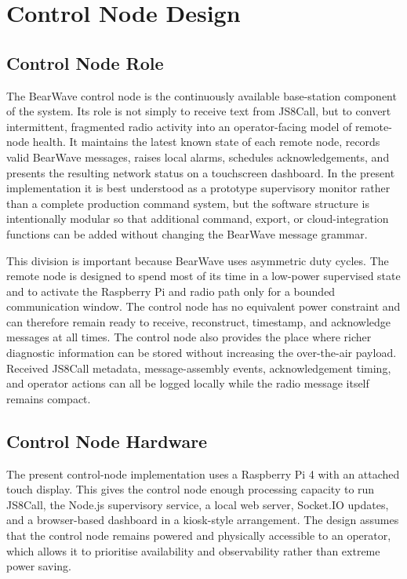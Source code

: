 \documentclass[acmsmall,screen]{acmart}
\begin{document}
\section{Control Node Design}

\subsection{Control Node Role}
The BearWave control node is the continuously available base-station component of the system. Its role is not simply to receive text from JS8Call, but to convert intermittent, fragmented radio activity into an operator-facing model of remote-node health. It maintains the latest known state of each remote node, records valid BearWave messages, raises local alarms, schedules acknowledgements, and presents the resulting network status on a touchscreen dashboard. In the present implementation it is best understood as a prototype supervisory monitor rather than a complete production command system, but the software structure is intentionally modular so that additional command, export, or cloud-integration functions can be added without changing the BearWave message grammar.

This division is important because BearWave uses asymmetric duty cycles. The remote node is designed to spend most of its time in a low-power supervised state and to activate the Raspberry Pi and radio path only for a bounded communication window. The control node has no equivalent power constraint and can therefore remain ready to receive, reconstruct, timestamp, and acknowledge messages at all times. The control node also provides the place where richer diagnostic information can be stored without increasing the over-the-air payload. Received JS8Call metadata, message-assembly events, acknowledgement timing, and operator actions can all be logged locally while the radio message itself remains compact.

\subsection{Control Node Hardware}
The present control-node implementation uses a Raspberry Pi 4 with an attached touch display. This gives the control node enough processing capacity to run JS8Call, the Node.js supervisory service, a local web server, Socket.IO updates, and a browser-based dashboard in a kiosk-style arrangement. The design assumes that the control node remains powered and physically accessible to an operator, which allows it to prioritise availability and observability rather than extreme power saving.
\end{document}
